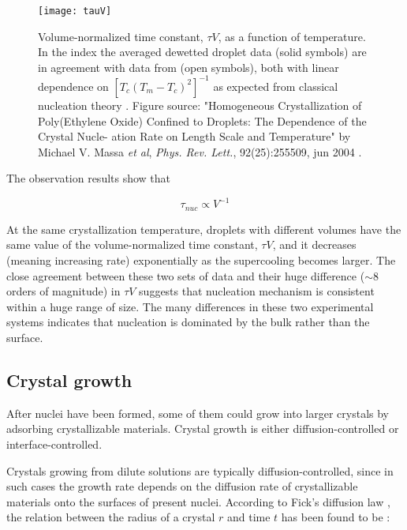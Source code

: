 \begin{figure}[H]
\center
\texttt{[image: tauV]}
\caption[Volume-normalized time constant, $\tau V$, as a function of temperature.]{Volume-normalized time constant, $\tau V$, as a function of temperature. In the index the averaged dewetted droplet data (solid symbols) are in agreement with data from \cite{Rottele2003} (open symbols), both with linear dependence on $[T_{c}(T_{m}-T_{c})^{2}]^{-1}$ as expected from classical nucleation theory \cite{Strobl2007}. Figure source: "Homogeneous Crystallization of Poly(Ethylene Oxide) Confined to Droplets: The Dependence of the Crystal Nucle- ation Rate on Length Scale and Temperature" by Michael V. Massa \textit{et al}, \textit{Phys. Rev. Lett.}, 92(25):255509, jun 2004 \cite{Yeates1984}.}
\label{fig:tauV}
\end{figure}

The observation results show that

\begin{equation}
\label{eqn_nucleation time}
\tau _{nuc} \propto V^{-1}
\end{equation}

At the same crystallization temperature, droplets with different volumes have the same value of the volume-normalized time constant, $\tau V$, and it decreases (meaning increasing rate) exponentially as the supercooling becomes larger. The close agreement between these two sets of data and their huge difference ($\sim 8$ orders of magnitude) in $\tau V$ suggests that nucleation mechanism is consistent within a huge range of size. The many differences in these two experimental systems indicates that nucleation is dominated by the bulk rather than the surface.

\subsection{Crystal growth}

After nuclei have been formed, some of them could grow into larger crystals by adsorbing crystallizable materials. Crystal growth is either diffusion-controlled or interface-controlled.

Crystals growing from dilute solutions are typically diffusion-controlled, since in such cases the growth rate depends on the diffusion rate of crystallizable materials onto the surfaces of present nuclei. According to Fick's diffusion law \cite{Fick1855,FickZiirich1995}, the relation between the radius of a crystal $r$ and time $t$ has been found to be \cite{Ouyang1998,Ouyang1999,HaoOuyang2004,Naga2013}:

